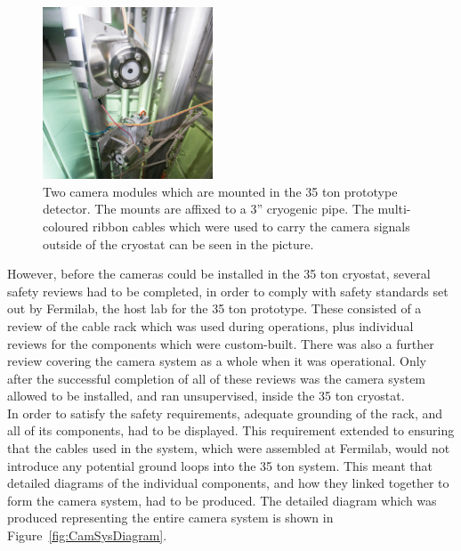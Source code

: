 \begin{figure}
  \centering
  \includegraphics[width=0.45\textwidth]{cammount35tcrop}
  \caption[Two camera modules which are mounted in the 35 ton prototype detector]
          {Two camera modules which are mounted in the 35 ton prototype detector. The mounts are affixed to a 3'' cryogenic pipe. The multi-coloured ribbon cables which were used to carry the camera signals outside of the cryostat can be seen in the picture.}
  \label{fig:CamMount}
\end{figure}

However, before the cameras could be installed in the 35 ton cryostat, several safety reviews had to be completed, in order to comply with safety standards set out by Fermilab, the host lab for the 35 ton prototype. These consisted of a review of the cable rack which was used during operations, plus individual reviews for the components which were custom-built. There was also a further review covering the camera system as a whole when it was operational. Only after the successful completion of all of these reviews was the camera system allowed to be installed, and ran unsupervised, inside the 35 ton cryostat. \\

In order to satisfy the safety requirements, adequate grounding of the rack, and all of its components, had to be displayed. This requirement extended to ensuring that the cables used in the system, which were assembled at Fermilab, would not introduce any potential ground loops into the 35 ton system. This meant that detailed diagrams of the individual components, and how they linked together to form the camera system, had to be produced. The detailed diagram which was produced representing the entire camera system is shown in Figure~\ref{fig:CamSysDiagram}. \\

